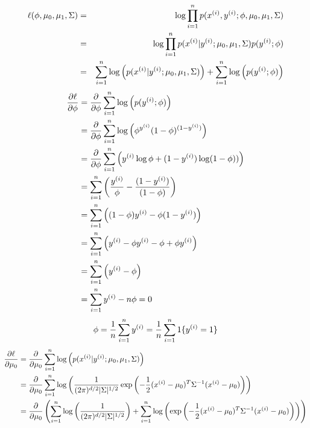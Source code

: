 \begin{answer}
  \begin{align*}
\ell(\phi, \mu_{0}, \mu_1, \Sigma) &=& \log \prod_{i=1}^{n} p(x^{(i)} , y^{(i)};\phi, \mu_{0}, \mu_1, \Sigma) \\
&=& \log \prod_{i=1}^{n} p(x^{(i)} | y^{(i)}; \mu_{0}, \mu_1, \Sigma) p(y^{(i)};\phi) \\
&=& \sum_{i=1}^{n} \log \left( p(x^{(i)} | y^{(i)}; \mu_{0}, \mu_1, \Sigma) \right) + \sum_{i=1}^{n} \log\left( p(y^{(i)};\phi)\right)
  \end{align*}
  \begin{align*}
\frac{\partial\ell}{\partial\phi}&=\frac{\partial}{\partial\phi}\sum_{i=1}^{n} \log \left( p(y^{(i)};\phi)\right)\\
&=\frac{\partial}{\partial\phi}\sum_{i=1}^{n} \log \left(\phi^{y^{(i)}} (1-\phi)^{(1-y^{(i)})} \right)\\
&=\frac{\partial}{\partial\phi}\sum_{i=1}^{n} \left( y^{(i)}\log \phi+(1-y^{(i)})\log (1-\phi) ) \right)\\
&=\sum_{i=1}^{n} \left( \frac{y^{(i)}}{\phi}-\frac{(1-y^{(i)})}{(1-\phi)}  \right)\\
&=\sum_{i=1}^{n} \left( (1-\phi)y^{(i)}-\phi(1-y^{(i)})  \right)\\
&=\sum_{i=1}^{n} \left( y^{(i)}-\phi y^{(i)}-\phi+\phi y^{(i)}  \right)\\
&=\sum_{i=1}^{n} \left( y^{(i)}-\phi \right)\\
&=\sum_{i=1}^{n} y^{(i)}-{n}\phi=0
  \end{align*}
  \begin{align*}
\phi=\frac{1}{{n}}\sum_{i=1}^{n} y^{(i)}=\frac{1}{{n}} \sum_{i=1}^{n} 1\{y^{(i)} = 1\}
  \end{align*}
  \begin{align*}
\frac{\partial\ell}{\partial\mu_{0}}&=\frac{\partial}{\partial\mu_{0}}\sum_{i=1}^\nexp \log \left( p(x^{(i)} | y^{(i)}; \mu_{0}, \mu_1, \Sigma) \right)\\
&=\frac{\partial}{\partial\mu_{0}}\sum_{i=1}^\nexp \log \left(\frac{1}{(2\pi)^{\di/2} |\Sigma|^{1/2}}\exp\left(-\frac{1}{2}(x^{(i)}-\mu_{0})^T \Sigma^{-1} (x^{(i)}-\mu_{0})\right) \right)\\
&=\frac{\partial}{\partial\mu_{0}}\left(\sum_{i=1}^\nexp \log \left(\frac{1}{(2\pi)^{\di/2} |\Sigma|^{1/2}}\right)+\sum_{i=1}^\nexp \log\left(\exp\left(-\frac{1}{2}(x^{(i)}-\mu_{0})^T \Sigma^{-1} (x^{(i)}-\mu_{0})\right) \right)\right)\\

\end{align*}
\end{answer}
